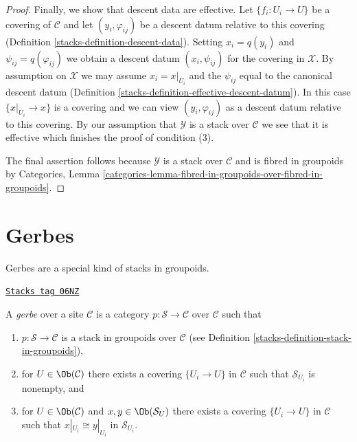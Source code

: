 \begin{proof}
\medskip\noindent
Finally, we show that descent data are effective. Let $\{f_i : U_i \to U\}$
be a covering of $\mathcal{C}$ and let $(y_i, \varphi_{ij})$ be a descent
datum relative to this covering (Definition \ref{stacks-definition-descent-data}).
Setting $x_i = q(y_i)$ and $\psi_{ij} = q(\varphi_{ij})$
we obtain a descent datum $(x_i, \psi_{ij})$ for the covering in $\mathcal{X}$.
By assumption on $\mathcal{X}$ we may assume $x_i = x|_{U_i}$
and the $\psi_{ij}$ equal to the canonical descent datum
(Definition \ref{stacks-definition-effective-descent-datum}).
In this case $\{x|_{U_i} \to x\}$ is a covering and we can view
$(y_i, \varphi_{ij})$ as a descent datum relative to this covering.
By our assumption that $\mathcal{Y}$ is a stack over $\mathcal{C}$
we see that it is effective which finishes the proof of condition (3).

\medskip\noindent
The final assertion follows because $\mathcal{Y}$ is a stack over
$\mathcal{C}$ and is fibred in groupoids by
Categories, Lemma
\ref{categories-lemma-fibred-in-groupoids-over-fibred-in-groupoids}.
\end{proof}

\section{Gerbes}
\label{stacks-section-gerbes}
Gerbes are a special kind of stacks in groupoids.

\begin{definition}[Gerbe]
\label{stacks-definition-gerbe}
\href{https://stacks.math.columbia.edu/tag/06NZ}{\texttt{Stacks tag 06NZ}}

A {\it gerbe} over a site $\mathcal{C}$ is a category
$p : \mathcal{S} \to \mathcal{C}$ over $\mathcal{C}$ such that
\begin{enumerate}
\item $p : \mathcal{S} \to \mathcal{C}$ is a stack
in groupoids over $\mathcal{C}$ (see
Definition \ref{stacks-definition-stack-in-groupoids}),
\item for $U \in \Ob(\mathcal{C})$ there exists
a covering $\{U_i \to U\}$ in $\mathcal{C}$ such that
$\mathcal{S}_{U_i}$ is nonempty, and
\item for $U \in \Ob(\mathcal{C})$ and
$x, y \in \Ob(\mathcal{S}_U)$ there exists
a covering $\{U_i \to U\}$ in $\mathcal{C}$ such that
$x|_{U_i} \cong y|_{U_i}$ in $\mathcal{S}_{U_i}$.
\end{enumerate}
\end{definition}

